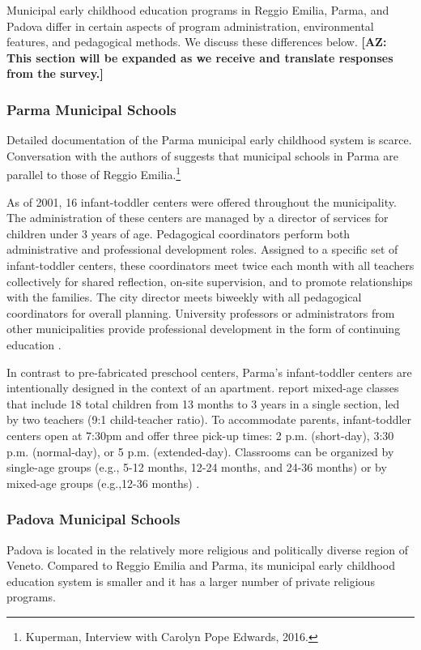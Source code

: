 Municipal early childhood education programs in Reggio Emilia, Parma, and Padova differ in certain aspects of program administration, environmental features, and pedagogical methods. We discuss these differences below. \textbf{[AZ: This section will be expanded as we receive and translate responses from the survey.]}

\subsubsection{Parma Municipal Schools}

Detailed documentation of the Parma municipal early childhood system is scarce. Conversation with the authors of \citet{Edwards-etal-eds_1998_Hundred-Languages} suggests that municipal schools in Parma are parallel to those of Reggio Emilia.\footnote{Kuperman, Interview with Carolyn Pope Edwards, 2016.} 

As of 2001, 16 infant-toddler centers were offered throughout the municipality. The administration of these centers are managed by a director of services for children under 3 years of age. Pedagogical coordinators perform both administrative and professional development roles. Assigned to a specific set of infant-toddler centers, these coordinators meet twice each month with all teachers collectively for shared reflection, on-site supervision, and to promote relationships with the families. The city director meets biweekly with all pedagogical coordinators for overall planning. University professors or administrators from other municipalities provide professional development in the form of continuing education \citep{Terzi-Cantarelli_2001_Parma}.

In contrast to pre-fabricated preschool centers, Parma's infant-toddler centers are intentionally designed in the context of an apartment. \citet{Terzi-Cantarelli_2001_Parma} report mixed-age classes that include 18 total children from 13 months to 3 years in a single section, led by two teachers (9:1 child-teacher ratio). To accommodate parents, infant-toddler centers open at 7:30pm and offer three pick-up times: 2 p.m. (short-day), 3:30 p.m. (normal-day), or 5 p.m. (extended-day). Classrooms can be organized by single-age groups (e.g., 5-12 months, 12-24 months, and 24-36 months) or by mixed-age groups (e.g.,12-36 months) \citep{Majorano-etal_2009_CC-in-P}.

\subsubsection{Padova Municipal Schools}
Padova is located in the relatively more religious and politically diverse region of Veneto. Compared to Reggio Emilia and Parma, its municipal early childhood education system is smaller and it has a larger number of private religious programs. 

